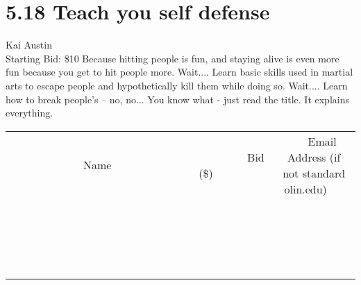 \documentclass[11pt]{article}
\begin{document}
\section*{5.18 Teach you self defense}
Kai Austin
\\
Starting Bid: \$10
\newline
Because hitting people is fun, and staying alive is even more fun because you get to hit people more. Wait....
Learn basic skills used in martial arts to escape people and hypothetically kill them while doing so. Wait....
Learn how to break people's -- no, no...
You know what - just read the title. It explains everything.
\\[3ex]
\begin{tabular}{c c c}
~~~~~~~~~~~~~Name~~~~~~~~~~~~~ & ~~~~~~~~~Bid (\$)~~~~~~~~~  & ~~~Email Address (if not standard olin.edu)~~~\\
 & & \\
\hline
 & & \\
\hline
 & & \\
\hline
 & & \\
\hline
 & & \\
\hline
 & & \\
\hline
 & & \\
\hline
 & & \\
\hline
 & & \\
\hline
 & & \\
\hline
 & & \\
\hline
 & & \\
\hline
 & & \\
\hline
 & & \\
\hline
 & & \\
\hline
 & & \\
\hline
 & & \\
\hline
 & & \\
\hline
 & & \\
\hline
\end{tabular}
\newpage
\end{document}
